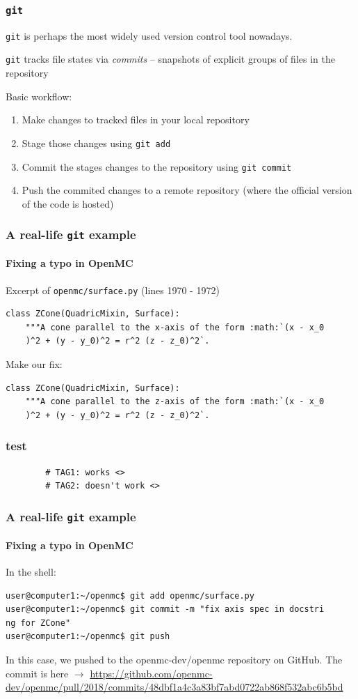 \begin{frame}[fragile]
    \frametitle{\verb:git:}
    \verb:git: is perhaps the most widely used version control tool nowadays.

    \verb:git: tracks file states via {\it commits} -- snapshots of explicit groups of files in the repository

    Basic workflow:
    \begin{enumerate}
        \item Make changes to tracked files in your local repository
        \item Stage those changes using \verb:git add:
        \item Commit the stages changes to the repository using \verb:git commit:
        \item Push the commited changes to a remote repository (where the official version of the code is hosted)
    \end{enumerate}

\end{frame}

\begin{frame}[fragile]
    \frametitle{A real-life \verb:git: example}
    \framesubtitle{Fixing a typo in OpenMC}

    Excerpt of \verb:openmc/surface.py: (lines 1970 - 1972)

    \begin{verbatim}
class ZCone(QuadricMixin, Surface):
    """A cone parallel to the x-axis of the form :math:`(x - x_0
    )^2 + (y - y_0)^2 = r^2 (z - z_0)^2`.
    \end{verbatim}
    Make our fix:
    
    \begin{verbatim}
class ZCone(QuadricMixin, Surface):
    """A cone parallel to the z-axis of the form :math:`(x - x_0
    )^2 + (y - y_0)^2 = r^2 (z - z_0)^2`.
    \end{verbatim}
\end{frame}
\begin{frame}[fragile]
    \frametitle{test}
    \begin{verbatim}
        # TAG1: works <>
        # TAG2: doesn't work <>
    \end{verbatim}   
\end{frame}

\begin{frame}[fragile]
    \frametitle{A real-life \verb:git: example}
    \framesubtitle{Fixing a typo in OpenMC}

    In the shell:
    \begin{verbatim}
user@computer1:~/openmc$ git add openmc/surface.py
user@computer1:~/openmc$ git commit -m "fix axis spec in docstri
ng for ZCone"
user@computer1:~/openmc$ git push
    \end{verbatim}

    In this case, we pushed to the openmc-dev/openmc repository on GitHub. The commit is here $\rightarrow$ \url{https://github.com/openmc-dev/openmc/pull/2018/commits/48dbf1a4c3a83bf7abd0722ab868f532abc6b5bd} 
\end{frame}
